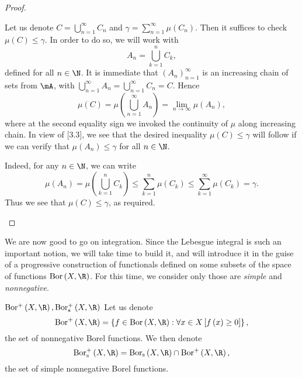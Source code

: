 \documentclass[pmath450]{subfiles}
\begin{document}
\begin{proof}
\begin{enumerate}
                Let us denote $C = \bigcup^{\infty}_{n=1}C_n$ and $\gamma=\sum^{\infty}_{n=1}\mu\left( C_n \right)$. Then it suffices to check $\mu\left( C \right)\leq\gamma$. In order to do so, we will work with
                \begin{equation*}
                    A_n = \bigcup^{n}_{k=1}C_k,
                \end{equation*}
                defined for all $n\in\N$. It is immediate that $\left( A_{n} \right)^{\infty}_{n=1}$ is an increasing chain of sets from $\mA$, with $\bigcup^{\infty}_{n=1}A_n=\bigcup^{\infty}_{n=1}C_n=C$. Hence
                \begin{equation}
                    \mu\left( C \right) = \mu\left( \bigcup^{\infty}_{n=1}A_n \right) = \lim_{n\to\infty}\mu\left( A_n \right),
                \end{equation}
                where at the second equality sign we invoked the continuity of $\mu$ along increasing chain. In view of [3.3], we see that the desired inequality $\mu\left( C \right)\leq\gamma$ will follow if we can verify that $\mu\left( A_n \right)\leq\gamma$ for all $n\in\N$.

                Indeed, for any $n\in\N$, we can write
                \begin{equation*}
                    \mu\left( A_n \right)=\mu\left( \bigcup^{n}_{k=1}C_k \right) \leq \sum^{n}_{k=1}\mu\left( C_k \right) \leq \sum^{\infty}_{k=1}\mu\left( C_k \right)=\gamma.
                \end{equation*}
                Thus we see that $\mu\left( C \right)\leq\gamma$, as required.
        \end{enumerate}
    \end{proof}

    \np We are now good to go on integration. Since the Lebesgue integral is such an important notion, we will take time to build it, and will introduce it in the guise of a progressive construction of functionals defined on some subsets of the space of functions $\bor\left( X,\R \right)$. For this time, we consider only those are \textit{simple} and \textit{nonnegative}.

    \begin{notation}{$\borplus\left( X,\R \right),\borpluss\left( X,\R \right)$}
        Let us denote
        \begin{equation*}
            \borplus\left( X,\R \right) = \left\lbrace f\in\bor\left( X,\R \right): \forall x\in X\left[ f\left( x \right)\geq 0 \right] \right\rbrace,
        \end{equation*}
        the set of nonnegative Borel functions. We then denote
        \begin{equation*}
            \borpluss\left( X,\R \right) = \bors\left( X,\R \right)\cap\borplus\left( X,\R \right),
        \end{equation*}
        the set of simple nonnegative Borel functions.
    \end{notation}
\end{document}
